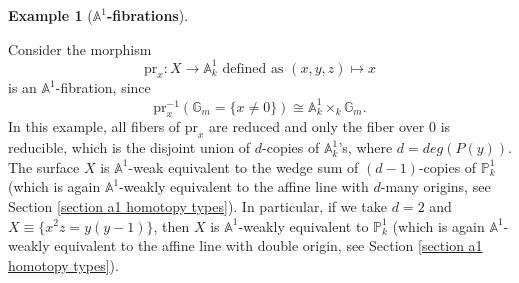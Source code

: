 \documentclass[11pt, reqno]{amsart}
\theoremstyle{plain}
\theoremstyle{definition}
\newtheorem{example}[thm]{Example}
\newcommand{\Spec}{{\rm Spec \,}}
\newcommand{\A}{{\mathbb A}}
\newcommand{\G}{{\mathbb G}}
\begin{document}
\begin{example} [\textbf{$\mathbb{A}^1$-fibrations}]
\begin{enumerate}
Consider the morphism 
$$\text{pr}_x: X \to \mathbb{A}^1_k \text{ defined as } (x,y,z) \mapsto x$$
is an $\A^1$-fibration, since 
$$\text{pr}_x^{-1}(\mathbb{G}_m = \{x \neq 0\}) \cong \mathbb{A}^1_k \times_k \mathbb{G}_m.$$ 
In this example, all fibers of $\text{pr}_x$ are reduced and only the fiber over $0$ is reducible, which is the disjoint union of $d$-copies of $\mathbb{A}^1_k$'s, where $d=deg(P(y))$. The surface $X$ is $\A^1$-weak equivalent to the wedge sum of $(d-1)$-copies of $\mathbb{P}^1_k$ \cite[Chapter 5, Proposition 5.3.4.3]{as} (which is again $\A^1$-weakly equivalent to the affine line with $d$-many origins, see Section \ref{section a1 homotopy types}). 
In particular, if we take $d=2$ and $X \equiv \{x^2z=y(y-1)\}$, then $X$ is $\A^1$-weakly equivalent to $\mathbb{P}^1_k$ (which is again $\A^1$-weakly equivalent to the affine line with double origin, see Section \ref{section a1 homotopy types}).



\end{enumerate}
\end{example}
\end{document}
